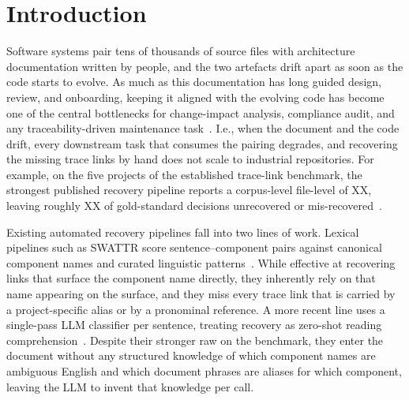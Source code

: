 \section{Introduction}
\label{sec:intro}


Software systems pair tens of thousands of source files with architecture documentation written by people, and the two artefacts drift apart as soon as the code starts to evolve.
As much as this documentation has long guided design, review, and onboarding, keeping it aligned with the evolving code has become one of the central bottlenecks for change-impact analysis, compliance audit, and any traceability-driven maintenance task~\cite{gotel1994analysis,clelandhuang2012handbook,maeder2015developers}.
I.e., when the document and the code drift, every downstream task that consumes the pairing degrades, and recovering the missing trace links by hand does not scale to industrial repositories.
For example, on the five projects of the established trace-link benchmark, the strongest published recovery pipeline reports a corpus-level file-level \fone of XX, leaving roughly XX of gold-standard decisions unrecovered or mis-recovered~\cite{keim_recovering_2024,replication}.

Existing automated recovery pipelines fall into two lines of work.
Lexical pipelines such as SWATTR score sentence--component pairs against canonical component names and curated linguistic patterns~\cite{keim_trace_2021}.
While effective at recovering links that surface the component name directly, they inherently rely on that name appearing on the surface, and they miss every trace link that is carried by a project-specific alias or by a pronominal reference.
A more recent line uses a single-pass \ac{LLM} classifier per sentence, treating recovery as zero-shot reading comprehension~\cite{fuchs_lissa_2025}.
Despite their stronger raw \fone on the benchmark, they enter the document without any structured knowledge of which component names are ambiguous English and which document phrases are aliases for which component, leaving the \ac{LLM} to invent that knowledge per call.

